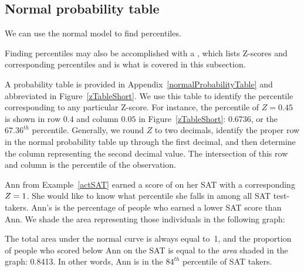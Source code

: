 \subsection{Normal probability table}

We can use the normal model to find percentiles.

Finding percentiles may also be accomplished with a
,
which lists Z-scores and corresponding percentiles
and is what is covered in this subsection.

A probability table is provided in
Appendix~\vref{normalProbabilityTable}
and abbreviated in Figure~\ref{zTableShort}.
We use this table to identify the percentile corresponding
to any particular Z-score.
For instance, the percentile of $Z = 0.45$ is shown in row
$0.4$ and column $0.05$ in Figure~\ref{zTableShort}:
0.6736, or the $67.36^{th}$ percentile.
Generally, we round $Z$ to two decimals, identify the proper
row in the normal probability table up through the first decimal,
and then determine the column representing the second decimal
value.
The intersection of this row and column is the percentile
of the observation.

\begin{examplewrap}
\begin{nexample}{Ann from Example~\ref{actSAT} earned a score
    of \annsatscore{} on her SAT with a corresponding
    $Z = 1{}$.
    She would like to know what percentile she falls in among
    all SAT test-takers.}
  Ann's  is the percentage of people who
  earned a lower SAT score than Ann.
  We shade the area representing those individuals in the
  following graph:
  \begin{center}
  \end{center}
  The total area under the normal curve is always equal to~1,
  and the proportion of people who scored below Ann on the SAT
  is equal to the \emph{area} shaded in the graph: 0.8413.
  In other words, Ann is in the $84^{th}$ percentile of
  SAT takers.
\end{nexample}
\end{examplewrap}

